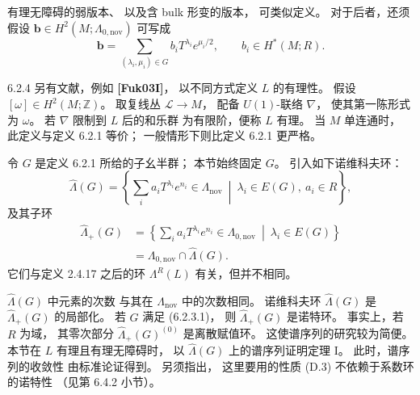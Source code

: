 有理无障碍的弱版本、
以及含 bulk 形变的版本，
可类似定义。
对于后者，还须假设
$\boldsymbol b\in H^2(M;\Lambda_{0,\mathrm{nov}})$
可写成
\[
\boldsymbol b
=\sum_{(\lambda_i,\mu_i)\in G}
b_iT^{\lambda_i}e^{\mu_i/2},
\qquad b_i\in H^*(M;R).
\]

\begin{remark}{6.2.4}\label{rem:6-2-4}
另有文献，例如 \textbf{[Fuk03I]}，
以不同方式定义 $L$ 的有理性。
假设 $[\omega]\in H^2(M;\mathbb Z)$。
取复线丛 $\mathcal L\to M$，
配备 $U(1)$-联络 $\nabla$，
使其第一陈形式为 $\omega$。
若 $\nabla$ 限制到 $L$ 后的和乐群
为有限阶，便称 $L$ 有理。
当 $M$ 单连通时，
此定义与定义 6.2.1 等价；
一般情形下则比定义 6.2.1 更严格。
\end{remark}

令 $G$ 是定义 6.2.1 所给的子幺半群；
本节始终固定 $G$。
引入如下诺维科夫环：
\begin{equation}
\widehat\Lambda(G)
=\left\{
\sum_i a_iT^{\lambda_i}e^{n_i}
\in\Lambda_{\mathrm{nov}}
\ \middle|\
\lambda_i\in E(G),\ a_i\in R
\right\},
\tag{6.2.5.1}\label{eq:6-2-5-1}
\end{equation}
及其子环
\begin{equation}
\begin{aligned}
\widehat\Lambda_+(G)
&=\left\{
\sum_i a_iT^{\lambda_i}e^{n_i}
\in\Lambda_{0,\mathrm{nov}}
\ \middle|\
\lambda_i\in E(G)
\right\}\\
&=\Lambda_{0,\mathrm{nov}}
\cap\widehat\Lambda(G).
\end{aligned}
\tag{6.2.5.2}\label{eq:6-2-5-2}
\end{equation}
它们与定义 2.4.17 之后的环
$\Lambda^R(L)$ 有关，但并不相同。

$\widehat\Lambda(G)$ 中元素的次数
与其在 $\Lambda_{\mathrm{nov}}$ 中的次数相同。
诺维科夫环 $\widehat\Lambda(G)$
是 $\widehat\Lambda_+(G)$ 的局部化。
若 $G$ 满足 (6.2.3.1)，
则 $\widehat\Lambda_+(G)$ 是诺特环。
事实上，若 $R$ 为域，
其零次部分
$\widehat\Lambda_+(G)^{(0)}$
是离散赋值环。
这使谱序列的研究较为简便。
本节在 $L$ 有理且有理无障碍时，
以 $\widehat\Lambda(G)$ 上的谱序列证明定理 I。
此时，谱序列的收敛性
由标准论证得到。
另须指出，
这里要用的性质 (D.3)
不依赖于系数环的诺特性
（见第 6.4.2 小节）。


